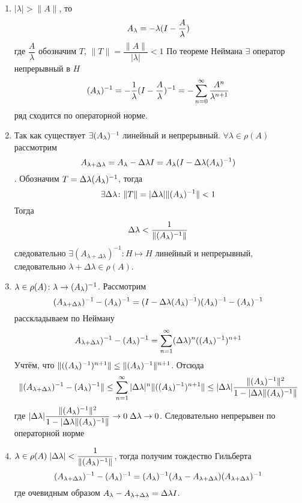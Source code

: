 \documentclass[14pt]{extarticle}
\begin{document}
\begin{Proof}
    \begin{enumerate}
        \item{$|\lambda| > \|A\|$, то
        $$
        \Al = -\lambda(I - \dfrac{A}{\lambda})
        $$
        где $\dfrac{A}{\lambda}$  обозначим $T$, $\|T\| = \dfrac{\|A\|}{|\lambda|}<1$
        По теореме Неймана $\exists$ оператор непрерывный в $H$
        $$
        (A_\lambda)^{-1} = -\dfrac{1}{\lambda}(I - \dfrac{A}{\lambda})^{-1} =
            -\sum_{n=0}^\infty \dfrac{A^n}{\lambda^{n+1}}
        $$
        ряд сходится по операторной норме.}
        \item{Так как существует $\exists (A_\lambda)^{-1}$ линейный и непрерывный.
        $\forall \lambda \in \rho(A)$ рассмотрим 
        $$
        A_{\lambda + \Delta\lambda} = \Al - \Delta\lambda I = \Al(I - 
            \Delta\lambda\Alo)
            $$.
            Обозначим $T = \Delta\lambda(A_\lambda)^{-1}$, тогда
            $$
            \exists \Delta\lambda\colon \|T\|=|\Delta\lambda|\|(A_\lambda)^{-1}\| < 1
            $$
            Тогда 
            $$
            \Delta\lambda < \dfrac{1}{\|(A_\lambda)^{-1}\|}
            $$
             следовательно $\exists (A_{\lambda+\Delta\lambda})^{-1} : H \mapsto H$ линейный и непрерывный, следовательно
            $\lambda + \Delta\lambda \in \rho(A)$.}
        \item{$\lambda \in \rho(A)\colon \lambda \to (A_\lambda)^{-1}$.
        Рассмотрим
            $$
            (A_{\lambda + \Delta\lambda})^{-1} - (A_\lambda)^{-1} = (I - \Delta\lambda(A_\lambda)^{-1})(A_\lambda)^{-1} - (A_\lambda)^{-1}
            $$
            расскладываем по Нейману 
            $$
            A_{\lambda + \Delta\lambda})^{-1} - (A_\lambda)^{-1} = \sum_{n=1}^\infty
            (\Delta\lambda)^n((A_\lambda)^{-1})^{n+1}
            $$
            Учтём, что $\|((A_\lambda)^{-1})^{n+1}\| \le \|(A_\lambda)^{-1}\|^{n+1}$.
            Отсюда 
            $$
            \|(A_{\lambda + \Delta\lambda})^{-1} - (A_\lambda)^{-1}\| \le \sum_{n=1}^\infty |\Delta\lambda|^n\|((A_\lambda)^{-1})^{n+1}\| \le
            |\Delta\lambda| \dfrac{\|(A_\lambda)^{-1}\|^2}{1-|\Delta\lambda\|(A_\lambda)^{-1}\|}
            $$
            где $|\Delta\lambda| \dfrac{\|(A_\lambda)^{-1}\|^2}{1-|\Delta\lambda\|(A_\lambda)^{-1}\|} \to 0\; \Delta\lambda \to 0$.
            Следовательно непрерывен по операторной норме}
        \item{$\lambda \in \rho(A)\;|\Delta\lambda| < \dfrac{1}{\|(A_\lambda)^{-1}\|}$, тогда
        получим тождество Гильберта 
        $$
        (A_{\lambda + \Delta\lambda})^{-1} - \Alo =
            \Alo(\Al - A_{\lambda + \Delta\lambda})(A_{\lambda + \Delta\lambda})^{-1} 
            $$
            где очевидным образом $\Al - A_{\lambda + \Delta\lambda} = \Delta\lambda I$.
}
\end{enumerate}
\end{Proof}
\end{document}
